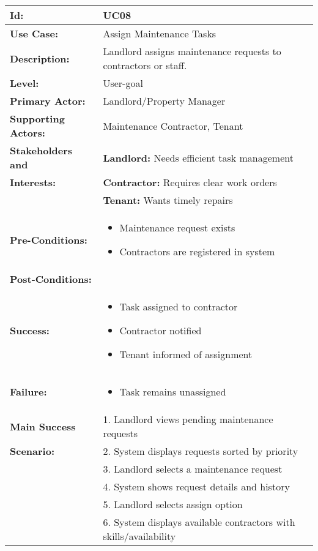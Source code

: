 \documentclass[12pt]{article}
\begin{document}
\begin{tabular}{|p{3cm}|p{11cm}|}
\hline
\textbf{Id:} & UC08 \\
\hline
\textbf{Use Case:} & Assign Maintenance Tasks \\
\hline
\textbf{Description:} & Landlord assigns maintenance requests to contractors or staff. \\
\hline
\textbf{Level:} & User-goal \\
\hline
\textbf{Primary Actor:} & Landlord/Property Manager \\
\hline
\textbf{Supporting Actors:} & Maintenance Contractor, Tenant \\
\hline
\textbf{Stakeholders and} & \textbf{Landlord:} Needs efficient task management \\
\textbf{Interests:} & \textbf{Contractor:} Requires clear work orders \\
& \textbf{Tenant:} Wants timely repairs \\
\hline
\textbf{Pre-Conditions:} & 
\begin{itemize}
    \item Maintenance request exists
    \item Contractors are registered in system
\end{itemize} \\
\hline
\textbf{Post-Conditions:} & \\
\textbf{Success:} & 
\begin{itemize}
    \item Task assigned to contractor
    \item Contractor notified
    \item Tenant informed of assignment
\end{itemize} \\
\textbf{Failure:} & 
\begin{itemize}
    \item Task remains unassigned
\end{itemize} \\
\hline
\textbf{Main Success} & 1. Landlord views pending maintenance requests \\
\textbf{Scenario:} & 2. System displays requests sorted by priority \\
& 3. Landlord selects a maintenance request \\
& 4. System shows request details and history \\
& 5. Landlord selects assign option \\
& 6. System displays available contractors with skills/availability \\

\end{tabular}
\end{document}
